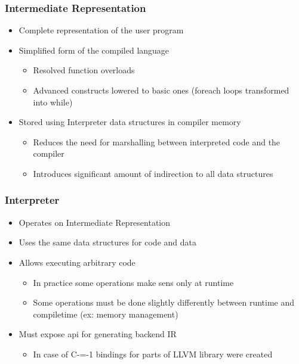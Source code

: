\begin{frame}
    \frametitle{Intermediate Representation}

    \begin{itemize}
        \item Complete representation of the user program
        \item Simplified form of the compiled language\begin{itemize}
            \item Resolved function overloads
            \item Advanced constructs lowered to basic ones (foreach loops transformed into while)
        \end{itemize}
        \item Stored using Interpreter data structures in compiler memory\begin{itemize}
            \item Reduces the need for marshalling between interpreted code and the compiler
            \item Introduces significant amount of indirection to all data structures
        \end{itemize}
    \end{itemize}

\end{frame}

\begin{frame}
    \frametitle{Interpreter}

    \begin{itemize}
        \item Operates on Intermediate Representation 
        \item Uses the same data structures for code and data
        \item Allows executing arbitrary code \begin{itemize}
            \item In practice some operations make sens only at runtime
            \item Some operations must be done slightly differently between runtime and compiletime (ex: memory management)
        \end{itemize}
        \item Must expose api for generating backend IR\begin{itemize}
            \item In case of C-=-1 bindings for parts of LLVM library were created
        \end{itemize}
    \end{itemize}

\end{frame}

